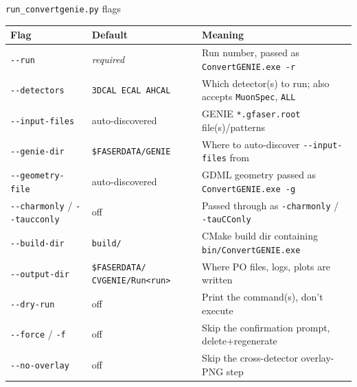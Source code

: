 \documentclass[aspectratio=169]{beamer}
\begin{document}
\begin{frame}{\texttt{run\_convertgenie.py} flags}
  \centering
  \tiny
  \begin{tabular}{@{}p{3.1cm}p{2.6cm}p{5.3cm}@{}}
    \toprule
    \textbf{Flag} & \textbf{Default} & \textbf{Meaning} \\
    \midrule
    \texttt{-{}-run} & \emph{required} & Run number, passed as
      \texttt{ConvertGENIE.exe -r} \\
    \texttt{-{}-detectors} & \texttt{3DCAL ECAL AHCAL} & Which detector(s)
      to run; also accepts \texttt{MuonSpec}, \texttt{ALL} \\
    \texttt{-{}-input-files} & auto-discovered & GENIE
      \texttt{*.gfaser.root} file(s)/patterns \\
    \texttt{-{}-genie-dir} & \texttt{\$FASERDATA/\allowbreak GENIE} & Where
      to auto-discover \texttt{-{}-input-files} from \\
    \texttt{-{}-geometry-file} & auto-discovered & GDML geometry passed as
      \texttt{ConvertGENIE.exe -g} \\
    \texttt{-{}-charmonly} / \texttt{-{}-taucconly} & off & Passed through
      as \texttt{-charmonly} / \texttt{-tauCConly} \\
    \texttt{-{}-build-dir} & \texttt{build/} & CMake build dir containing
      \texttt{bin/ConvertGENIE.exe} \\
    \texttt{-{}-output-dir} & \texttt{\$FASERDATA/\allowbreak
      CVGENIE/\allowbreak Run<run>} & Where PO files, logs, plots are
      written \\
    \texttt{-{}-dry-run} & off & Print the command(s), don't execute \\
    \texttt{-{}-force} / \texttt{-f} & off & Skip the confirmation prompt,
      delete+regenerate \\
    \texttt{-{}-no-overlay} & off & Skip the cross-detector overlay-PNG step \\
    \bottomrule
  \end{tabular}
\end{frame}
\end{document}
